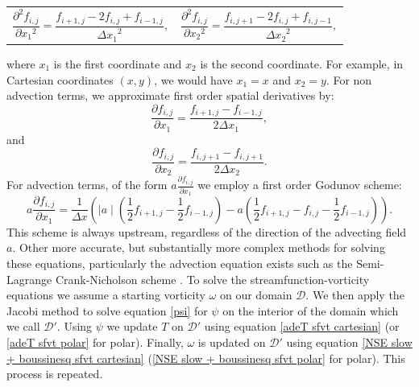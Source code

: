 \documentclass{article}
\begin{document}
\begin{tabularx}{\textwidth}{XX}
\begin{equation}
	\frac{\partial^2 f_{i,j}}{\partial {x_1}^2} = \frac{f_{i+1,j} - 2 f_{i,j} + f_{i-1,j}}{{\Delta x_1}^2},
\end{equation}
    &
\begin{equation}
	\frac{\partial^2 f_{i,j}}{\partial {x_2}^2} = \frac{f_{i,j+1} - 2 f_{i,j} + f_{i,j-1}}{{\Delta x_2}^2},
\end{equation}
\end{tabularx}
where $x_1$ is the first coordinate and $x_2$ is the second coordinate. For example, in Cartesian coordinates $(x,y)$, we would have $x_1=x$ and $x_2=y$. 
For non advection terms, we approximate first order spatial derivatives by:
\begin{equation}
	\frac{\partial f_{i,j}}{\partial x_1} = \frac{f_{i+1,j} - f_{i-1,j}}{2{\Delta x_1}},
\end{equation}
and
\begin{equation}
	\frac{\partial f_{i,j}}{\partial x_2} = \frac{f_{i,j+1} - f_{i,j+1}}{2{\Delta x_2}}.
\end{equation}
For advection terms, of the form $a \frac{\partial f_{i,j}}{\partial x_1}$ we employ a first order Godunov scheme:
\begin{equation}
	a \frac{\partial f_{i,j}}{\partial x_1} = \frac{1}{\Delta x} ( \mid a\mid (  \frac{1}{2} f_{i+1,j} - \frac{1}{2} f_{i-1,j}   ) - a ( \frac{1}{2} f_{i+1,j} -f_{i,j} - \frac{1}{2} f_{i-1,j} )).
\end{equation}
This scheme is always upstream, regardless of the direction of the advecting field $a$.
\newline
Other more accurate, but substantially more complex methods for solving these equations, particularly the advection equation exists such as the Semi-Lagrange Crank-Nicholson scheme \cite{spiegelman2006semi}.
\newline
To solve the streamfunction-vorticity equations we assume a starting vorticity $\omega$ on our domain $\mathcal{D}$. We then apply the Jacobi method to solve equation \ref{psi} for $\psi$ on the interior of the domain which we call $\mathcal{D}'$. 
Using $\psi$ we update $T$ on $\mathcal{D}'$ using equation \ref{adeT sfvt cartesian} (or \ref{adeT sfvt polar} for polar). Finally, $\omega$ is updated on $\mathcal{D}'$ using 
equation \ref{NSE slow + boussinesq sfvt cartesian} (\ref{NSE slow + boussinesq sfvt polar} for polar). This process is repeated.
\end{document}
